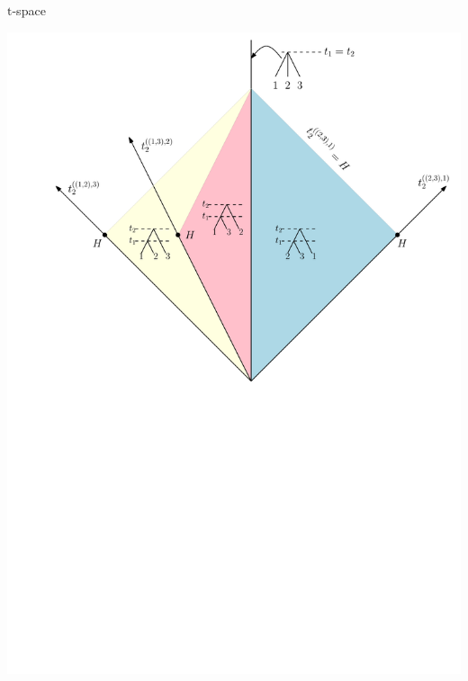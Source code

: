 \documentclass{beamer}
\renewcommand{\t}{$\mathrm{t}$}
\theoremstyle{example}
\begin{document}
\begin{frame}{\t-space}
\begin{definition}
\begin{center}
\includegraphics[width=0.78\framewidth]{tSpace2d}
\end{center}
\end{definition}
\end{frame}
\end{document}
